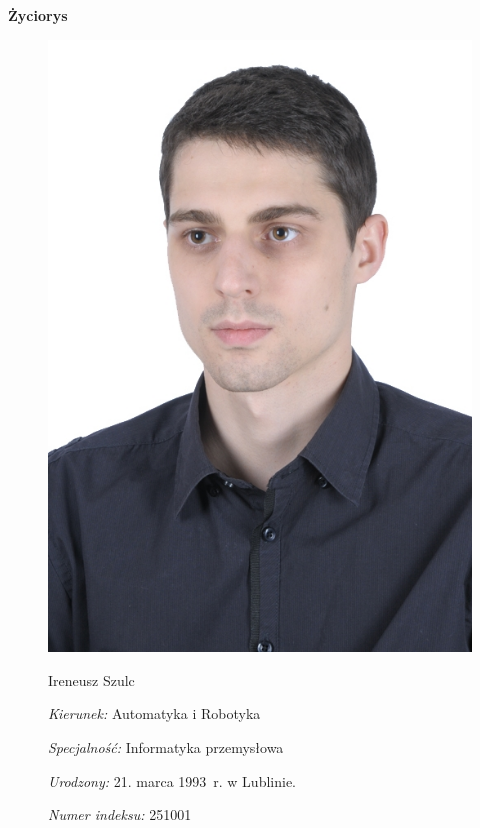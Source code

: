 \thispagestyle{empty}

\vspace*{2cm}

\begin{center}
	\textbf{Życiorys}
\end{center}
\begin{figure}[ht] %
	\begin{minipage}[b]{0.35\textwidth} %
		\centering
		\includegraphics[width=\textwidth]{img/me-cv.jpg}
	\end{minipage}
	\hspace{0.5cm}
	\begin{minipage}[b]{0.6\textwidth}
		\begin{flushleft}
		Ireneusz Szulc
		
		{\it Kierunek:} Automatyka i Robotyka
		
		{\it Specjalność: } Informatyka przemysłowa
		
		{\it Urodzony:} 21. marca 1993~r. w Lublinie.
		
		{\it Numer indeksu:} 251001
		
		\end{flushleft}
	\end{minipage}
\end{figure}

